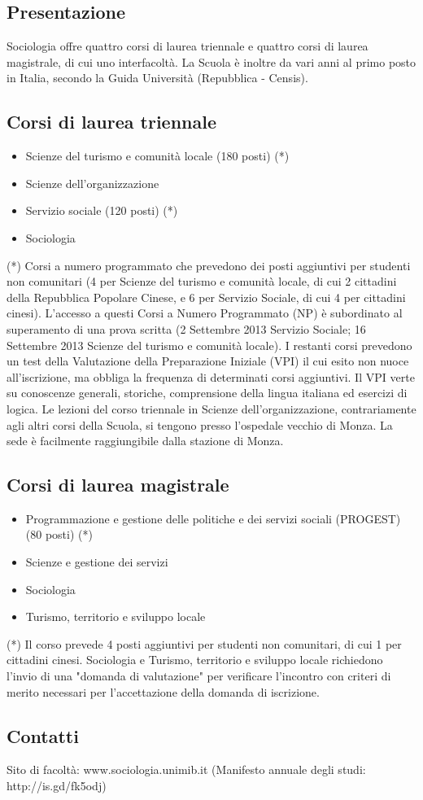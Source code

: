 
\subsection{Presentazione}
Sociologia offre quattro corsi di laurea triennale e quattro corsi di laurea magistrale, di cui uno interfacoltà. La Scuola è inoltre da vari anni al primo posto in Italia, secondo la Guida Università (Repubblica - Censis). 

\subsection{Corsi di laurea triennale}
\begin{itemize}
\item Scienze del turismo e comunità locale (180 posti) (*) 
\item Scienze dell'organizzazione 
\item Servizio sociale (120 posti) (*) 
\item Sociologia
\end{itemize}
(*) Corsi a numero programmato che prevedono dei posti aggiuntivi per studenti non comunitari (4 per Scienze del turismo e comunità locale, di cui 2 cittadini della Repubblica Popolare Cinese, e 6 per Servizio Sociale, di cui 4 per cittadini cinesi). 
L'accesso a questi Corsi a Numero Programmato (NP) è subordinato al superamento di una prova scritta (2 Settembre 2013 Servizio Sociale; 16 Settembre 2013 Scienze del turismo e comunità locale). 
I restanti corsi prevedono un test della Valutazione della Preparazione Iniziale (VPI) il cui esito non nuoce all'iscrizione, ma obbliga la frequenza di determinati corsi aggiuntivi. Il VPI  verte su conoscenze generali, storiche, comprensione della lingua italiana ed esercizi di logica.
Le lezioni del corso triennale in Scienze dell'organizzazione, contrariamente agli altri corsi della Scuola, si tengono presso l'ospedale vecchio di Monza. La sede è facilmente raggiungibile dalla stazione di Monza. 

\subsection{Corsi di laurea magistrale}
\begin{itemize}
\item Programmazione e gestione delle politiche e dei servizi sociali (PROGEST) (80 posti) (*) 
\item Scienze e gestione dei servizi 
\item Sociologia 
\item Turismo, territorio e sviluppo locale
\end{itemize}
(*) Il corso prevede 4 posti aggiuntivi per studenti non comunitari, di cui 1 per cittadini cinesi. 
Sociologia e Turismo, territorio e sviluppo locale richiedono l'invio di una "domanda di valutazione" per verificare l'incontro con criteri di merito necessari per l'accettazione della domanda di iscrizione.

\subsection{Contatti}
Sito di facoltà: www.sociologia.unimib.it 
(Manifesto annuale degli studi: http://is.gd/fk5odj)
